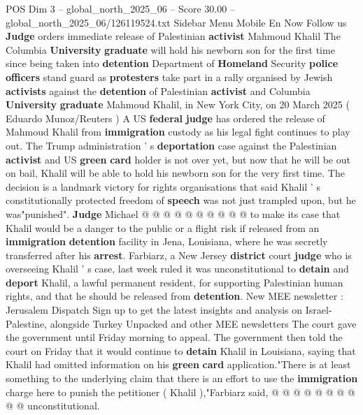 \begin{textsample}{POS Dim 3 – global\_north\_2025\_06 – Score 30.00 – global\_north\_2025\_06/126119524.txt}  \label{ex:f3_pos_091}
Sidebar Menu Mobile En Now Follow us \textbf{Judge} orders immediate release of Palestinian \textbf{activist} Mahmoud Khalil The Columbia \textbf{University} \textbf{graduate} will hold his newborn son for the first time since being taken into \textbf{detention} Department of \textbf{Homeland} Security \textbf{police} \textbf{officers} stand guard as \textbf{protesters} take part in a rally organised by Jewish \textbf{activists} against the \textbf{detention} of Palestinian \textbf{activist} and Columbia \textbf{University} \textbf{graduate} Mahmoud Khalil, in New York City, on 20 March 2025 ( Eduardo Munoz/Reuters ) A US \textbf{federal} \textbf{judge} has ordered the release of Mahmoud Khalil from \textbf{immigration} custody as his legal fight continues to play out.
The Trump administration ' s \textbf{deportation} case against the Palestinian \textbf{activist} and US \textbf{green} \textbf{card} holder is not over yet, but now that he will be out on bail, Khalil will be able to hold his newborn son for the very first time.
The decision is a landmark victory for rights organisations that said Khalil ' s constitutionally protected freedom of \textbf{speech} was not just trampled upon, but he was"punished". \textbf{Judge} Michael @ @ @ @ @ @ @ @ @ @ to make its case that Khalil would be a danger to the public or a flight risk if released from an \textbf{immigration} \textbf{detention} facility in Jena, Louisiana, where he was secretly transferred after his \textbf{arrest}.
Farbiarz, a New Jersey \textbf{district} court \textbf{judge} who is overseeing Khalil ' s case, last week ruled it was unconstitutional to \textbf{detain} and \textbf{deport} Khalil, a lawful permanent resident, for supporting Palestinian human rights, and that he should be released from \textbf{detention}.
New MEE newsletter : Jerusalem Dispatch Sign up to get the latest insights and analysis on Israel-Palestine, alongside Turkey Unpacked and other MEE newsletters The court gave the government until Friday morning to appeal.
The government then told the court on Friday that it would continue to \textbf{detain} Khalil in Louisiana, saying that Khalil had omitted information on his \textbf{green} \textbf{card} application."There is at least something to the underlying claim that there is an effort to use the \textbf{immigration} charge here to punish the petitioner ( Khalil ),"Farbiarz said, @ @ @ @ @ @ @ @ @ @ unconstitutional.

\end{textsample}
